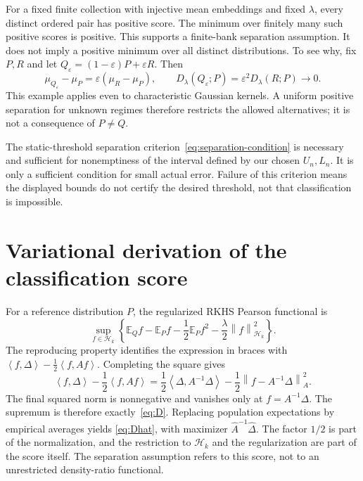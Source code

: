 \documentclass[11pt,a4paper]{article}
\theoremstyle{definition}
\theoremstyle{remark}
\newcommand{\HH}{\mathcal H_k}
\newcommand{\E}{\mathbb E}
\newcommand{\norm}[1]{\left\lVert#1\right\rVert}
\newcommand{\inner}[2]{\left\langle#1,#2\right\rangle}
\begin{document}
For a fixed finite collection with injective mean embeddings and fixed
$\lambda$, every distinct ordered pair has positive score. The minimum
over finitely many such positive scores is positive. This supports a
finite-bank separation assumption.
It does not imply a positive minimum over all distinct distributions.
To see why, fix $P,R$ and let $Q_\varepsilon=(1-\varepsilon)P+\varepsilon R$.
Then
\[
 \mu_{Q_\varepsilon}-\mu_P=\varepsilon(\mu_R-\mu_P),\qquad
 D_\lambda(Q_\varepsilon;P)=\varepsilon^2D_\lambda(R;P)\longrightarrow0.
\]
This example applies even to characteristic Gaussian kernels. A uniform
positive separation for unknown regimes therefore restricts the allowed
alternatives; it is not a consequence of $P\ne Q$.

The static-threshold separation criterion~\eqref{eq:separation-condition} is necessary
and sufficient for nonemptiness of the interval defined by our chosen
$U_n,L_n$. It is only a sufficient condition for small actual error.
Failure of this criterion means the displayed bounds do not certify
the desired threshold, not that classification is impossible.

\section{Variational derivation of the classification score}\label{app:variational}
For a reference distribution $P$, the regularized RKHS Pearson
functional is
\begin{equation}\label{eq:variational}
 \sup_{f\in\HH}\left\{
 \E_Qf-\E_Pf-\frac12\E_P f^2-\frac\lambda2\norm{f}_{\HH}^2
 \right\}.
\end{equation}
The reproducing property identifies the expression in braces with
$\inner{f}{\Delta}-\frac12\inner{f}{Af}$. Completing the square gives
\[
 \inner{f}{\Delta}-\frac12\inner{f}{Af}
 =\frac12\inner{\Delta}{A^{-1}\Delta}
  -\frac12\norm{f-A^{-1}\Delta}_{A}^{2}.
\]
The final squared norm is nonnegative and vanishes only at
$f=A^{-1}\Delta$. The supremum is therefore exactly~\eqref{eq:D}.
Replacing population expectations by empirical averages yields
\eqref{eq:Dhat}, with maximizer $\widehat A^{-1}\widehat\Delta$.
The factor $1/2$ is part of the normalization, and the restriction to
$\HH$ and the regularization are part of the score itself. The
separation assumption refers to this score, not to an unrestricted
density-ratio functional.
\end{document}
